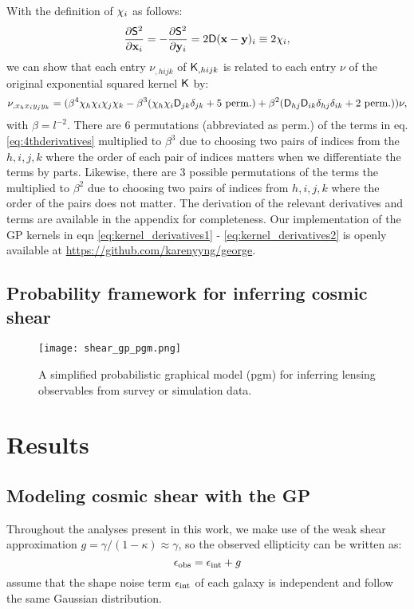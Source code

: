 With the definition of ${\bf \chi}_i$ as follows:
\begin{equation}
	\frac{\partial \mathsf{S}^2}{\partial \mathbf{x}_i} = -\frac{\partial
	\mathsf{S}^2}{\partial \mathbf{y}_i} =
	2 \mathsf{D}(\mathbf{x} - \mathbf{y})_i \equiv 2{\bf \chi}_i,
\end{equation}
we can show that each entry $\nu_{,hijk}$ of $\mathsf{K}_{,hijk}$ is
related to each entry $\nu$ of the original exponential squared kernel
$\mathsf{K}$ by:
\begin{equation}
\nu_{,x_h x_i y_j y_k} = (\beta^4 \chi_h \chi_i \chi_j \chi_k -
\beta^3 (\chi_h \chi_i \mathsf{D}_{jk} \delta_{jk} + 5~{\rm perm.}) + \beta^2
(\mathsf{D}_{hj} \mathsf{D}_{ik}\delta_{hj}\delta_{ik} + 2~{\rm perm.})) \nu,
\label{eq:4thderivatives}
\end{equation}
with $\beta = l^{-2}$. There are 6 permutations (abbreviated as perm.) of the terms in
eq. \ref{eq:4thderivatives}
multiplied to $\beta^3$ due
to choosing two pairs of indices from the $h,i,j,k$ where the order of each
pair of indices matters when we differentiate the terms by parts. 
Likewise, there are 3 possible permutations of
the terms the multiplied to $\beta^2$ due to choosing two pairs of indices from
$h, i, j, k$ where the order of the pairs does not matter.
The derivation of the relevant derivatives and terms are available 
in the appendix for completeness. 
Our implementation of the GP kernels in eqn \ref{eq:kernel_derivatives1} - 
\ref{eq:kernel_derivatives2} is openly available at
\href{https://github.com/karenyyng/george}{https://github.com/karenyyng/george}.


\subsection{Probability framework for inferring cosmic shear}
\begin{figure}
	\centering
	\texttt{[image: shear\_gp\_pgm.png]}
	\caption{A simplified probabilistic graphical model (pgm) for inferring
		lensing observables from survey or simulation data.
		\label{fig:simplified_pgm}}
\end{figure}






\section{Results}



\subsection{Modeling cosmic shear with the GP}
Throughout the analyses present in this work, 
we make use of the weak shear approximation 
$g = \gamma / (1 - \kappa)  \approx \gamma$, so the observed ellipticity can be
written as: 
\begin{equation}
	\epsilon_{\rm obs} = \epsilon_{\rm int} + g 
\end{equation}
assume that the shape noise term $\epsilon_{\rm int}$ of each galaxy is 
independent and follow the same Gaussian distribution.  



